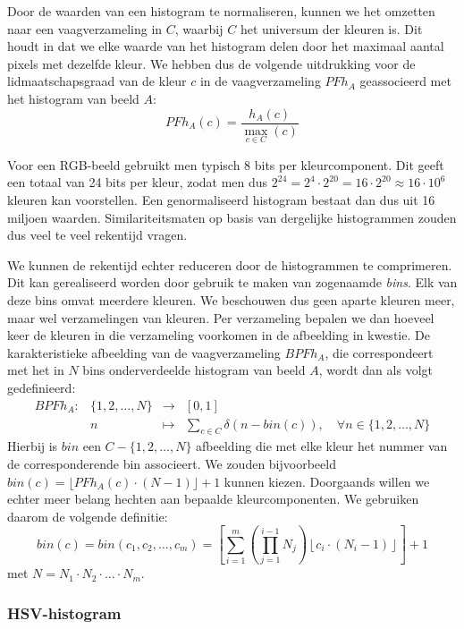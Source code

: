 Door de waarden van een histogram te normaliseren, kunnen we het omzetten naar een 
vaagverzameling in $C$, waarbij $C$ het universum der kleuren is. Dit houdt in dat we elke
waarde van het histogram delen door het maximaal aantal pixels met dezelfde kleur. 
We hebben dus de volgende uitdrukking voor de lidmaatschapsgraad van de kleur $c$ in de 
vaagverzameling $PFh_A$ geassocieerd met het histogram van beeld $A$:
$$
PFh_A(c) = \frac{\displaystyle h_A(c)}{\displaystyle \max_{c \in C}(c)}
$$

Voor een RGB-beeld gebruikt men typisch 8 bits per kleurcomponent. Dit geeft een totaal van
24 bits per kleur, zodat men dus $2^{24}=2^4 \cdot 2^{20}=16 \cdot 2^{20} \approx 16 \cdot 10^6$
kleuren kan voorstellen. Een genormaliseerd histogram bestaat dan dus uit 16 miljoen waarden.
Similariteitsmaten op basis van dergelijke histogrammen zouden dus veel te veel rekentijd vragen.

We kunnen de rekentijd echter reduceren door de histogrammen te comprimeren. Dit kan 
gerealiseerd worden door gebruik te 
maken van zogenaamde \emph{bins}. Elk van deze bins omvat meerdere kleuren. We beschouwen dus 
geen aparte kleuren meer, maar wel verzamelingen van kleuren. Per verzameling bepalen we dan 
hoeveel keer de kleuren in die verzameling voorkomen 
in de afbeelding in kwestie. De karakteristieke afbeelding van de vaagverzameling $BPFh_A$, die
correspondeert met het in $N$ bins onderverdeelde histogram van beeld $A$, wordt dan als volgt
gedefinieerd:  
$$
\begin{array}{lrcl}
BPFh_A: 	& \{1,2,\ldots,N\} 	& \to 		& [0,1] \\[5pt]
		& n						& \mapsto	& \displaystyle\sum_{c \in C} \delta (n -  bin(c)),
\quad\forall n \in \{1,2,\ldots,N\}
\end{array}
$$
Hierbij is $bin$ een $C - \{1,2,\ldots,N\}$ afbeelding die met elke kleur het nummer van de 
corresponderende bin associeert. We zouden bijvoorbeeld 
$bin(c) = \lfloor PFh_A(c) \cdot (N-1) \rfloor + 1$ kunnen kiezen. Doorgaands willen we echter
meer belang hechten aan bepaalde kleurcomponenten. We gebruiken daarom de volgende definitie:
$$
bin(c) = bin(c_1,c_2,\ldots,c_m) = \left[ \sum_{i=1}^m \left( \prod_{j=1}^{i-1} N_j \right) \left\lfloor c_i \cdot (N_i - 1) \right\rfloor \right] + 1
$$
met $N=N_1 \cdot N_2 \cdot \ldots \cdot N_m$.

\subsubsection{HSV-histogram}


